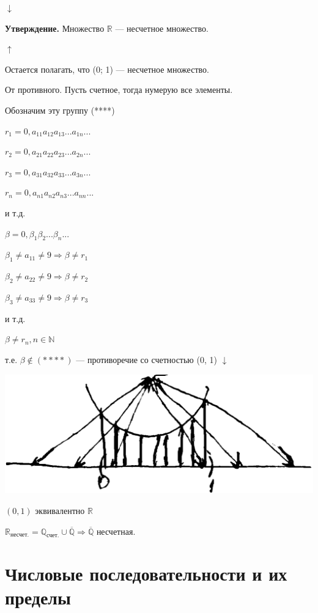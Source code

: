 \documentclass{article}
\begin{document}
        $\downarrow$

        \textbf{Утверждение.} Множество $\mathbb{R}$ --- несчетное множество.

        $\uparrow$

        Остается полагать, что (0; 1) --- несчетное множество.

        От противного. Пусть счетное, тогда нумерую все элементы.

        Обозначим эту группу (****)

        $r_1 = 0,a_{11}a_{12}a_{13}...a_{1n}...$

        $r_2 = 0,a_{21}a_{22}a_{23}...a_{2n}...$

        $r_3 = 0,a_{31}a_{32}a_{33}...a_{3n}...$

        $r_n = 0,a_{n1}a_{n2}a_{n3}...a_{nn}...$

        и т.д.

        $\beta = 0,\beta_1\beta_2...\beta_n...$

        $\beta_1 \neq a_{11} \neq 9 \Rightarrow \beta \neq r_1$
        
        $\beta_2 \neq a_{22} \neq 9 \Rightarrow \beta \neq r_2$
        
        $\beta_3 \neq a_{33} \neq 9 \Rightarrow \beta \neq r_3$

        и т.д.

        $\beta \neq r_n, n \in \mathbb{N}$

        т.е. $\beta \not\in (****)$ --- противоречие со счетностью (0, 1) $\downarrow$

        \includegraphics[scale=0.15]{d_ch_8_2}

        $(0, 1)$ эквивалентно $\mathbb{R}$

        $\mathbb{R}_{\textrm{несчет.}} = \mathbb{Q}_{\textrm{счет.}} \cup \overline{\mathbb{Q}} \Rightarrow \overline{\mathbb{Q}}$ несчетная.


    \section{Числовые последовательности и их пределы}
    
\end{document}
